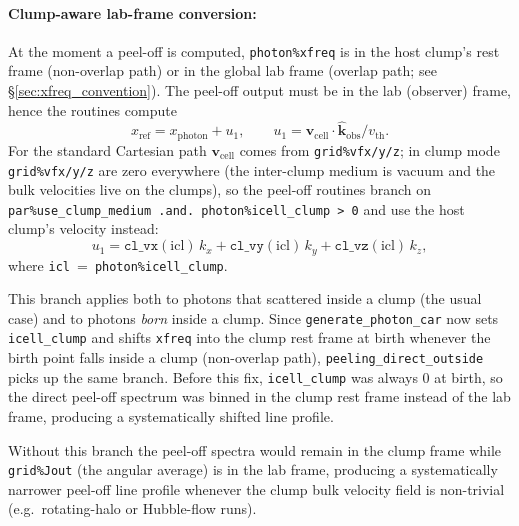 \documentclass[english,a4paper]{my_memo}
\begin{document}
\paragraph{Clump-aware lab-frame conversion:}
At the moment a peel-off is computed, \texttt{photon\%xfreq} is in the
host clump's rest frame (non-overlap path) or in the global lab frame
(overlap path; see \S\ref{sec:xfreq_convention}).
The peel-off output must be in the lab (observer) frame, hence the
routines compute
\begin{equation}
  x_\mathrm{ref} = x_\mathrm{photon} + u_1,\qquad
  u_1 = \boldsymbol{v}_\mathrm{cell}\cdot\hat{\mathbf{k}}_\mathrm{obs}/v_\mathrm{th}.
\end{equation}
For the standard Cartesian path $\boldsymbol{v}_\mathrm{cell}$ comes from
\texttt{grid\%vfx/y/z}; in clump mode \texttt{grid\%vfx/y/z} are zero
everywhere (the inter-clump medium is vacuum and the bulk velocities live
on the clumps), so the peel-off routines branch on
\texttt{par\%use\_clump\_medium .and. photon\%icell\_clump > 0} and use
the host clump's velocity instead:
\begin{equation}
  u_1 = \texttt{cl\_vx}(\mathrm{icl})\,k_x + \texttt{cl\_vy}(\mathrm{icl})\,k_y + \texttt{cl\_vz}(\mathrm{icl})\,k_z,
\end{equation}
where \texttt{icl}~=~\texttt{photon\%icell\_clump}.

This branch applies both to photons that scattered inside a clump (the
usual case) and to photons \emph{born} inside a clump.  Since
\texttt{generate\_photon\_car} now sets \texttt{icell\_clump} and shifts
\texttt{xfreq} into the clump rest frame at birth whenever the birth
point falls inside a clump (non-overlap path),
\texttt{peel\-ing\_di\-rect\_out\-side} picks up the same branch.
Before this fix, \texttt{icell\_clump} was always 0 at birth, so the
direct peel-off spectrum was binned in the clump rest frame instead of
the lab frame, producing a systematically shifted line profile.

Without this branch the peel-off spectra would remain in the clump frame
while \texttt{grid\%Jout} (the angular average) is in the lab frame,
producing a systematically narrower peel-off line profile whenever the
clump bulk velocity field is non-trivial (e.g.\ rotating-halo or
Hubble-flow runs).
\end{document}

